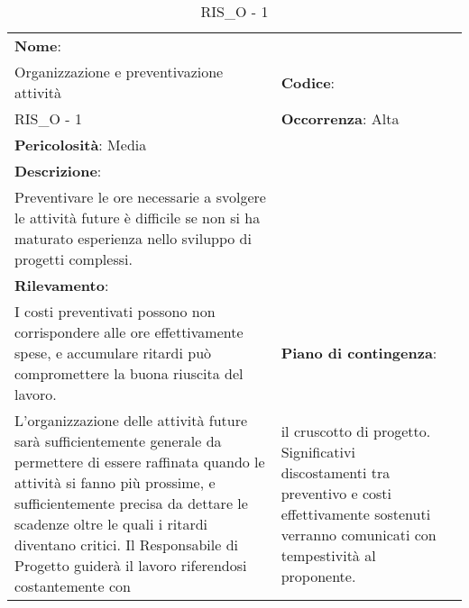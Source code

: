 \renewcommand{\arraystretch}{1.5}
\begin{longtable} { 
		>{\raggedright}p{} 
		>{\raggedright}p{} 
		>{\raggedright}p{}    }
	
	\caption{RIS\_O - 1} \endhead	
	
	
	\textbf{Nome}: \\ Organizzazione e preventivazione attività
	& \textbf{Codice}: \\ RIS\_O - 1
	& \textbf{Occorrenza}: Alta \\ \textbf{Pericolosità}: Media
	
	\tabularnewline
	
	\textbf{Descrizione}: \\ Preventivare le ore necessarie a svolgere le attività future è difficile se non si ha maturato esperienza nello sviluppo di progetti complessi. \\
	\textbf{Rilevamento}: \\ I costi preventivati possono non corrispondere alle ore effettivamente spese, e accumulare ritardi può compromettere la buona riuscita del lavoro.
	& 
	\textbf{Piano di contingenza}: \\ L'organizzazione delle attività future sarà sufficientemente generale da permettere di essere raffinata quando le attività si fanno più prossime, e sufficientemente precisa da dettare le scadenze oltre le quali i ritardi diventano critici. Il Responsabile di Progetto guiderà il lavoro riferendosi costantemente con 
	&  
	il cruscotto di progetto. Significativi discostamenti tra preventivo e costi effettivamente sostenuti verranno comunicati con tempestività al proponente.
	
\end{longtable}



